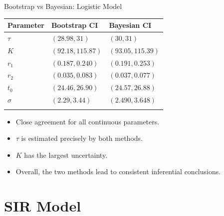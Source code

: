 \documentclass[
  ignorenonframetext,
  aspectratio=169,
]{beamer}
\providecommand{\tightlist}{%
  \setlength{\itemsep}{0pt}\setlength{\parskip}{0pt}}\usepackage{longtable,booktabs,array}
\begin{document}
\begin{frame}{Bootstrap vs Bayesian: Logistic Model}
\label{bootstrap-vs-bayesian-logistic-model-1}
\begin{longtable}[]{@{}lll@{}}
\toprule\noalign{}
Parameter & Bootstrap CI & Bayesian CI \\
\midrule\noalign{}
\endhead
\(\tau\) & \((28.98, 31)\) & \((30,31)\) \\
\(K\) & \((92.18, 115.87)\) & \((93.05, 115.39)\) \\
\(r_1\) & \((0.187, 0.240)\) & \((0.191,0.253)\) \\
\(r_2\) & \((0.035, 0.083)\) & \((0.037, 0.077)\) \\
\(t_0\) & \((24.46, 26.90)\) & \((24.57, 26.88)\) \\
\(\sigma\) & \((2.29, 3.44)\) & \((2.490, 3.648)\) \\
\bottomrule\noalign{}
\end{longtable}

\begin{itemize}
\tightlist
\item
  Close agreement for all continuous parameters.
\item
  \(\tau\) is estimated precisely by both methods.
\item
  \(K\) has the largest uncertainty.
\item
  Overall, the two methods lead to consistent inferential conclusions.
\end{itemize}
\end{frame}

\section{SIR Model}\label{sir-model}
\end{document}
